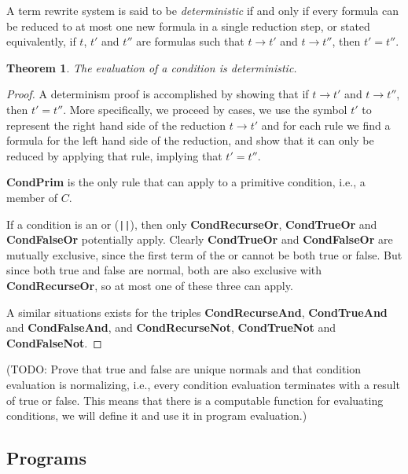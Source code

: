 \documentclass[11pt]{article}
\begin{document}
A term rewrite system is said to be \emph{deterministic} if and only if every formula can be reduced to at most one new formula in a single reduction step, or stated equivalently, if $t$, $t'$ and $t''$ are formulas such that $t \rightarrow t'$ and $t \rightarrow t''$, then $t' = t''$.

\newtheorem{conditiondeterminism}{Theorem}
\begin{conditiondeterminism}
The evaluation of a condition is deterministic.
\end{conditiondeterminism}

\begin{proof}

A determinism proof is accomplished by showing that if $t \rightarrow t'$ and $t \rightarrow t''$, then $t' = t''$.  More specifically, we proceed by cases, we use the symbol $t'$ to represent the right hand side of the reduction $t \rightarrow t'$ and for each rule we find a formula for the left hand side of the reduction, and show that it can only be reduced by applying that rule, implying that $t' = t''$.

\textbf{CondPrim} is the only rule that can apply to a primitive condition, i.e., a member of $C$.

If a condition is an or (\texttt{||}), then only \textbf{CondRecurseOr}, \textbf{CondTrueOr} and \textbf{CondFalseOr} potentially apply.  Clearly \textbf{CondTrueOr} and \textbf{CondFalseOr} are mutually exclusive, since the first term of the or cannot be both true or false.  But since both true and false are normal, both are also exclusive with \textbf{CondRecurseOr}, so at most one of these three can apply.

A similar situations exists for the triples \textbf{CondRecurseAnd}, \textbf{CondTrueAnd} and \textbf{CondFalseAnd}, and \textbf{CondRecurseNot}, \textbf{CondTrueNot} and \textbf{CondFalseNot}.

\end{proof}

(TODO: Prove that true and false are unique normals and that condition evaluation is normalizing, i.e., every condition evaluation terminates with a result of true or false.  This means that there is a computable function for evaluating conditions, we will define it and use it in program evaluation.)

\subsection{Programs}
\end{document}
